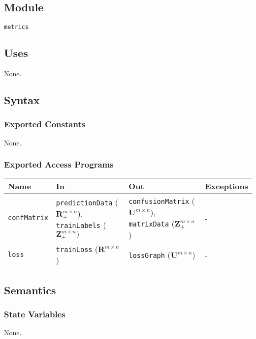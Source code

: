 \documentclass[12pt, titlepage]{article}
\def\code#1{\texttt{#1}}
\begin{document}
\subsection{Module}

\code{metrics}

\subsection{Uses}

None.

\subsection{Syntax}

\subsubsection{Exported Constants}

None.

\subsubsection{Exported Access Programs}

\begin{center}
\begin{tabular}{p{3cm} p{4cm} p{4cm} p{1cm}}
\hline
\textbf{Name} & \textbf{In} & \textbf{Out} & \textbf{Exceptions} \\
\hline
\code{confMatrix} & \code{predictionData} ($\mathbf{R}_{+}^{m \times n}$), \code{trainLabels} ($\mathbf{Z}_{+}^{m \times n})$ & \code{confusionMatrix} ($\mathbf{U}^{m \times n}$), \code{matrixData} ($\mathbf{Z}_{+}^{m \times n}$)  & - \\
\code{loss} & \code{trainLoss} ($\mathbf{R}^{m \times n}$) & \code{lossGraph} ($\mathbf{U}^{m \times n}$)  & - \\
\hline
\end{tabular}
\end{center}

\subsection{Semantics}

\subsubsection{State Variables}

None.
\end{document}
